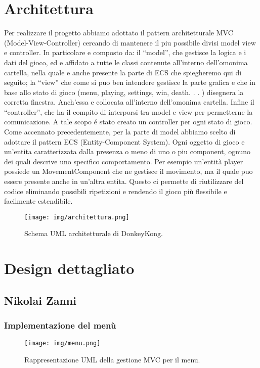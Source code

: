 \section{Architettura}
Per realizzare il progetto abbiamo adottato il pattern architetturale MVC (Model-View-Controller) cercando di mantenere il piu possibile divisi model view e controller. In particolare e composto da: il “model”, che gestisce la logica e i dati del gioco, ed e affidato a tutte le classi contenute all’interno dell’omonima cartella, nella quale e anche presente la parte di ECS che spiegheremo qui di seguito; la “view” che come si puo ben intendere gestisce la parte grafica e che in base allo stato di gioco (menu, playing, settings, win, death. . . ) disegnera la corretta finestra. Anch’essa e collocata all’interno dell’omonima cartella. Infine il “controller”, che ha il compito di interporsi tra model e view per permetterne la comunicazione. A tale scopo é stato creato un controller per ogni stato di gioco.
Come accennato precedentemente, per la parte di model abbiamo scelto di adottare il pattern ECS (Entity-Component System). Ogni oggetto di gioco e un’entita caratterizzata dalla presenza o meno di uno o piu component, ognuno dei quali descrive uno specifico comportamento. Per esempio un’entità player possiede un MovementComponent che ne gestisce il movimento, ma il quale puo essere presente anche in un’altra entita. Questo ci permette di riutilizzare del codice eliminando possibili ripetizioni e rendendo il gioco più flessibile e facilmente estendibile.

\begin{figure}[H]
\centering{}
\texttt{[image: img/architettura.png]}
\caption{Schema UML architetturale di DonkeyKong.}
\label{img:architettura}
\end{figure}

\section{Design dettagliato}
\subsection{Nikolai Zanni}

\subsubsection{Implementazione del menù}

\begin{figure}[H]
\centering{}
\texttt{[image: img/menu.png]}
\caption{Rappresentazione UML della gestione MVC per il menu.}
\end{figure}

